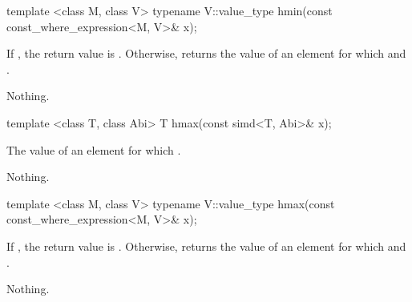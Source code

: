 \begin{itemdecl}
template <class M, class V> typename V::value_type hmin(const const_where_expression<M, V>& x);
\end{itemdecl}
\begin{itemdescr}
  \pnum\returns If , the return value is .
  Otherwise, returns the value of an element  for which  and  .

  \pnum\throws Nothing.
\end{itemdescr}

\begin{itemdecl}
template <class T, class Abi> T hmax(const simd<T, Abi>& x);
\end{itemdecl}
\begin{itemdescr}
  \pnum\returns The value of an element  for which  \foralli.

  \pnum\throws Nothing.
\end{itemdescr}

\begin{itemdecl}
template <class M, class V> typename V::value_type hmax(const const_where_expression<M, V>& x);
\end{itemdecl}
\begin{itemdescr}
  \pnum\returns If , the return value is .
  Otherwise, returns the value of an element  for which  and  .

  \pnum\throws Nothing.
\end{itemdescr}


